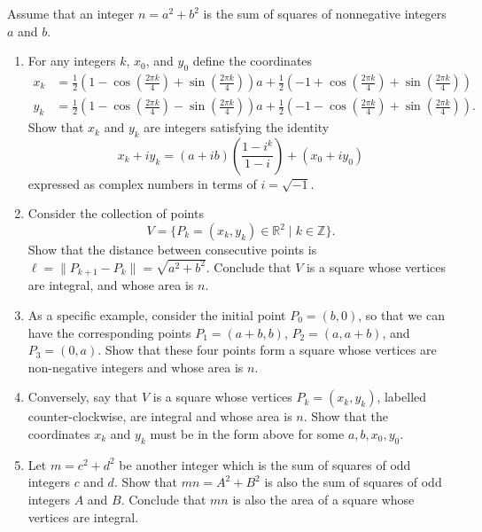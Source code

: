 \documentclass[12 pt, letterpaper]{hmcpset}
\begin{document}
\begin{problem}[3]
	Assume that an integer $n = a^{2} + b^{2}$ is the sum of squares of nonnegative integers $a$ and $b$.
	\begin{enumerate}
		\item For any integers $k$, $x_{0}$, and  $y_{0}$ define the coordinates
			\[
				\begin{split}
					x_{k} & = \frac{1}{2} \left ( 1 - \cos{\left ( \frac{2 \pi k}{4} \right ) + \sin{\left ( \frac{2 \pi k}{4} \right )}} \right ) a + \frac{1}{2} \left ( -1 + \cos{\left ( \frac{2 \pi k}{4} \right ) + \sin{\left ( \frac{2 \pi k}{4} \right )}} \right ) \\
					y_{k} & = \frac{1}{2} \left ( 1 - \cos{\left ( \frac{2 \pi k}{4} \right ) - \sin{\left ( \frac{2 \pi k}{4} \right )}} \right ) a + \frac{1}{2} \left ( -1 - \cos{\left ( \frac{2 \pi k}{4} \right ) + \sin{\left ( \frac{2 \pi k}{4} \right )}} \right ).
				\end{split}
			\]
			Show that $x_{k}$ and $y_{k}$ are integers satisfying the identity
			\[
				x_{k} + i y_{k} = (a + i b) \left ( \frac{1 - i^{k}}{1 - i} \right ) + (x_{0} + i y_{0})
			\]
			expressed as complex numbers in terms of $i = \sqrt{-1}$.
		\item Consider the collection of points
			\[
				V = \{ P_{k} = (x_{k}, y_{k}) \in \mathbb{R}^{2} \mid k \in \mathbb{Z} \}.
			\]
			Show that the distance between consecutive points is $\ell = \lVert P_{k + 1} - P_{k} \rVert = \sqrt{a^{2} + b^{2}}$. Conclude that $V$ is a square whose vertices are integral, and whose area is $n$.
		\item As a specific example, consider the initial point $P_{0} = (b, 0)$, so that we can have the corresponding points $P_{1} = (a + b, b)$, $P_{2} = (a, a + b)$, and $P_{3} = (0, a)$. Show that these four points form a square whose vertices are non-negative integers and whose area is $n$.
		\item Conversely, say that $V$ is a square whose vertices $P_{k} = (x_{k}, y_{k})$, labelled counter-clockwise, are integral and whose area is $n$. Show that the coordinates $x_{k}$ and $y_{k}$ must be in the form above for some $a, b, x_{0}, y_{0}$.
		\item Let $m = c^{2} + d^{2}$ be another integer which is the sum of squares of odd integers $c$ and $d$. Show that $mn = A^{2} + B^{2}$ is also the sum of squares of odd integers $A$ and $B$. Conclude that $mn$ is also the area of a square whose vertices are integral.
	\end{enumerate}
\end{problem}
\end{document}
